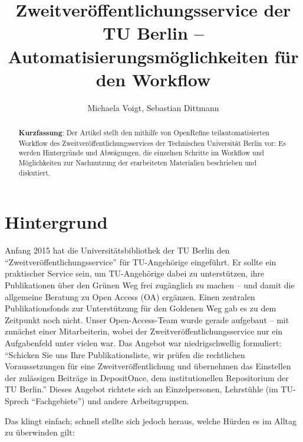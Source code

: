 \documentclass[a4paper,
fontsize=11pt,
oneside,
numbers=noperiodatend,
parskip=half-,
bibliography=totoc,
final
]{scrartcl}
\title{\LARGE{Zweitveröffentlichungsservice der TU Berlin – Automatisierungsmöglichkeiten für den Workflow}}%
\author{Michaela Voigt, Sebastian Dittmann} %
\date{}
\begin{document}
\maketitle
\thispagestyle{fancyplain} 

\begin{abstract}
\textbf{Kurzfassung}: Der Artikel stellt den mithilfe von OpenRefine
teilautomatisierten Workflow des Zweitveröffentlichungsservices der
Technischen Universität Berlin vor: Es werden Hintergründe und
Abwägungen, die einzelnen Schritte im Workflow und Möglichkeiten zur
Nachnutzung der erarbeiteten Materialien beschrieben und diskutiert.
\end{abstract}

\hypertarget{hintergrund}{%
\section*{Hintergrund}\label{hintergrund}}

Anfang 2015 hat die Universitätsbibliothek der TU Berlin den
\enquote{Zweitveröffentlichungsservice} für TU-Angehörige eingeführt. Er
sollte ein praktischer Service sein, um TU-Angehörige dabei zu
unterstützen, ihre Publikationen über den Grünen Weg frei zugänglich zu
machen -- und damit die allgemeine Beratung zu Open Access (OA)
ergänzen. Einen zentralen Publikationsfonds zur Unterstützung für den
Goldenen Weg gab es zu dem Zeitpunkt noch nicht. Unser Open-Access-Team
wurde gerade aufgebaut -- mit zunächst einer Mitarbeiterin, wobei der
Zweitveröffentlichungsservice nur ein Aufgabenfeld unter vielen war. Das
Angebot war niedrigschwellig formuliert: \enquote{Schicken Sie uns Ihre
Publikationsliste, wir prüfen die rechtlichen Voraussetzungen für eine
Zweitveröffentlichung und übernehmen das Einstellen der zulässigen
Beiträge in DepositOnce, dem institutionellen Repositorium der TU
Berlin.} Dieses Angebot richtete sich an Einzelpersonen, Lehrstühle (im
TU-Sprech \enquote{Fachgebiete}) und andere Arbeitsgruppen.

Das klingt einfach; schnell stellte sich jedoch heraus, welche Hürden es
im Alltag zu überwinden gilt:
\end{document}
